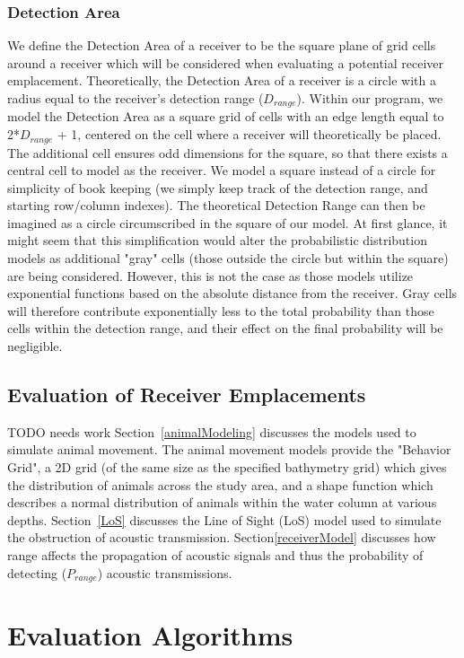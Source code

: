 \subsubsection{Detection Area}
We define the Detection Area of a receiver to be the square plane of grid cells around a receiver which will be considered when evaluating a potential receiver emplacement.  Theoretically, the Detection Area of a receiver is a circle with a radius equal to the receiver's detection range ($D_{range}$).  Within our program, we model the Detection Area as a square grid of cells with an edge length equal to 2*$D_{range}$ + 1, centered on the cell where a receiver will theoretically be placed.  The additional cell ensures odd dimensions for the square, so that there exists a central cell to model as the receiver.  We model a square instead of a circle for simplicity of book keeping (we simply keep track of the detection range, and starting row/column indexes).  The theoretical Detection Range can then be imagined as a circle circumscribed in the square of our model.  At first glance, it might seem that this simplification would alter the probabilistic distribution models as additional "gray" cells (those outside the circle but within the square) are being considered.  However, this is not the case as those models utilize exponential functions based on the absolute distance from the receiver.  Gray cells will therefore contribute exponentially less to the total probability than those cells within the detection range, and their effect on the final probability will be negligible.  


\subsection{Evaluation of Receiver Emplacements} TODO needs work
\label{evaluationOfReceiver}
Section~\ref{animalModeling} discusses the models used to simulate animal movement.  The animal movement models provide the "Behavior Grid", a 2D grid (of the same size as the specified bathymetry grid) which gives the distribution of animals across the study area, and a shape function which describes a normal distribution of animals within the water column at various depths.  Section~\ref{LoS} discusses the Line of Sight (LoS) model used to simulate the obstruction of acoustic transmission.  Section\ref{receiverModel} discusses how range affects the propagation of acoustic signals and thus the probability of detecting ($P_{range}$) acoustic transmissions.


\section{Evaluation Algorithms}
\label{evaluationAlgorithms}
